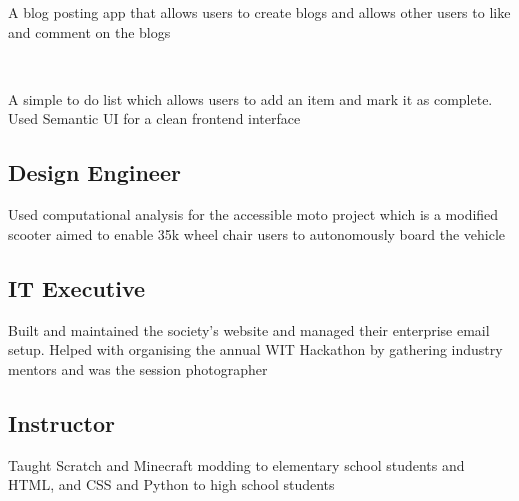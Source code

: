 \documentclass[11pt, a4paper]{MagicalCV}
\begin{document}
\begin{minipage}[t]{1\textwidth}
A blog posting app that allows users to create blogs and allows other users to like and comment on the blogs
\sectionsep

\\
 
A simple to do list which allows users to add an item and mark it as complete. Used Semantic UI for a clean frontend interface
\sectionsep 

\sectionsep
\subsection{Design Engineer}

\vspace{\topsep} %
Used computational analysis for the accessible moto project which is a modified scooter aimed to enable 35k wheel chair users to autonomously board the vehicle
\sectionsep

\subsection{IT Executive}
\vspace{\topsep} %
Built and maintained the society's website and managed their enterprise email setup. Helped with organising the annual WIT Hackathon by gathering industry mentors and was the session photographer
\sectionsep

\subsection{Instructor}
\vspace{\topsep} %
Taught Scratch and Minecraft modding to elementary school students and HTML, and CSS and Python to high school students
\sectionsep

\end{minipage}
\end{document}
